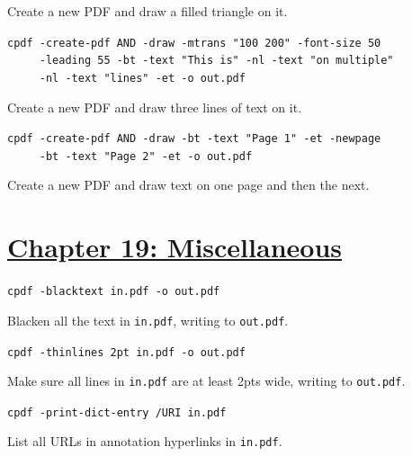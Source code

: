 \documentclass{book}
\begin{document}
\noindent Create a new PDF and draw a filled triangle on it.

\begin{framed}
 \noindent\small\verb?cpdf -create-pdf AND -draw -mtrans "100 200" -font-size 50?\\
 \noindent\small\verb?     -leading 55 -bt -text "This is" -nl -text "on multiple"?\\
 \noindent\small\verb?     -nl -text "lines" -et -o out.pdf?
\end{framed}

\noindent Create a new PDF and draw three lines of text on it.

\begin{framed}
 \noindent\small\verb!cpdf -create-pdf AND -draw -bt -text "Page 1" -et -newpage!\\
 \noindent\small\verb!     -bt -text "Page 2" -et -o out.pdf!
\end{framed}

\noindent Create a new PDF and draw text on one page and then the next.

\section*{\hyperref[chap:misc]{Chapter 19: Miscellaneous}}

\begin{framed}\noindent\texttt{cpdf -blacktext in.pdf -o out.pdf}\end{framed}

\noindent Blacken all the text in \texttt{in.pdf}, writing to \texttt{out.pdf}.

\begin{framed}\noindent\texttt{cpdf -thinlines 2pt in.pdf -o out.pdf}\end{framed}

\noindent Make sure all lines in \texttt{in.pdf} are at least 2pts wide, writing to \texttt{out.pdf}.


\begin{framed}\noindent\texttt{cpdf -print-dict-entry /URI in.pdf}\end{framed}

\noindent List all URLs in annotation hyperlinks in \texttt{in.pdf}.

\pagestyle{empty}
\cleardoublepage
\end{document}
